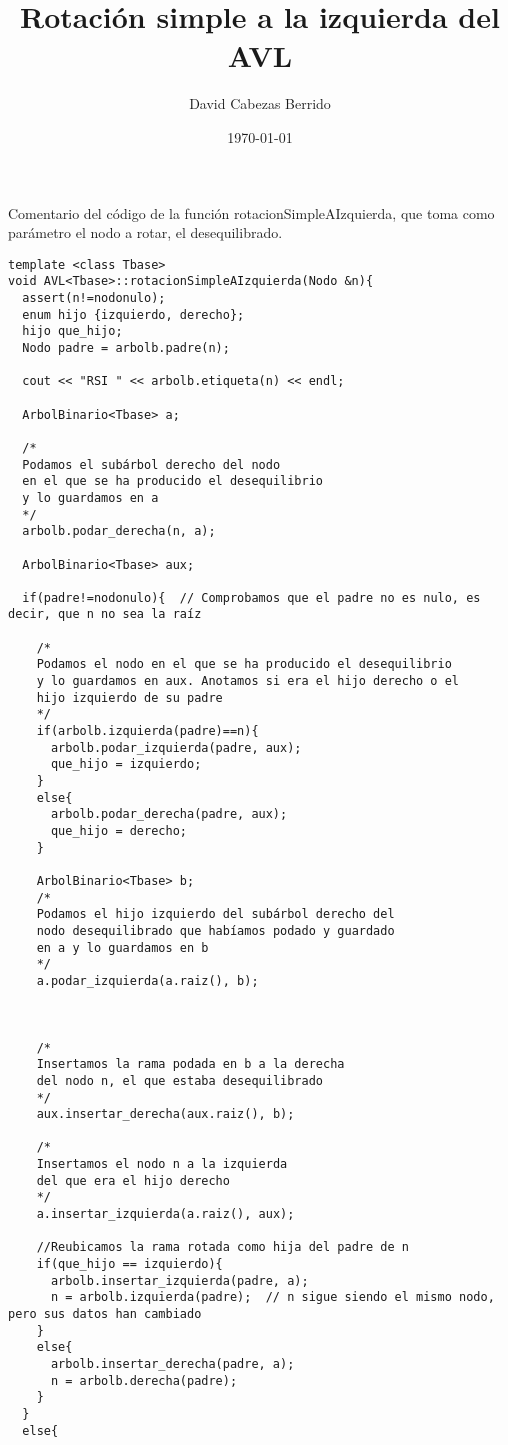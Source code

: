 \documentclass{article}
\begin{document}
\title{Rotación simple a la izquierda del AVL}
\author{David Cabezas Berrido}
\date{\today}
\maketitle

\begin{justify}
  Comentario del código de la función rotacionSimpleAIzquierda,
  que toma como parámetro el nodo a rotar, el desequilibrado.
\end{justify}

\begin{verbatim}
template <class Tbase>
void AVL<Tbase>::rotacionSimpleAIzquierda(Nodo &n){
  assert(n!=nodonulo);
  enum hijo {izquierdo, derecho};
  hijo que_hijo;
  Nodo padre = arbolb.padre(n);
  
  cout << "RSI " << arbolb.etiqueta(n) << endl;
  
  ArbolBinario<Tbase> a;

  /*
  Podamos el subárbol derecho del nodo
  en el que se ha producido el desequilibrio
  y lo guardamos en a
  */
  arbolb.podar_derecha(n, a);
  
  ArbolBinario<Tbase> aux;
  
  if(padre!=nodonulo){  // Comprobamos que el padre no es nulo, es decir, que n no sea la raíz
    
    /*
    Podamos el nodo en el que se ha producido el desequilibrio
    y lo guardamos en aux. Anotamos si era el hijo derecho o el 
    hijo izquierdo de su padre
    */
    if(arbolb.izquierda(padre)==n){    
      arbolb.podar_izquierda(padre, aux);
      que_hijo = izquierdo;
    }
    else{
      arbolb.podar_derecha(padre, aux);
      que_hijo = derecho;
    }
    
    ArbolBinario<Tbase> b;
    /*
    Podamos el hijo izquierdo del subárbol derecho del
    nodo desequilibrado que habíamos podado y guardado
    en a y lo guardamos en b
    */
    a.podar_izquierda(a.raiz(), b);



    /*
    Insertamos la rama podada en b a la derecha
    del nodo n, el que estaba desequilibrado
    */
    aux.insertar_derecha(aux.raiz(), b);
    
    /*
    Insertamos el nodo n a la izquierda 
    del que era el hijo derecho
    */
    a.insertar_izquierda(a.raiz(), aux);
    
    //Reubicamos la rama rotada como hija del padre de n
    if(que_hijo == izquierdo){
      arbolb.insertar_izquierda(padre, a);
      n = arbolb.izquierda(padre);  // n sigue siendo el mismo nodo, pero sus datos han cambiado
    }
    else{
      arbolb.insertar_derecha(padre, a);
      n = arbolb.derecha(padre);
    }
  }
  else{
    

\end{verbatim}
\end{document}
